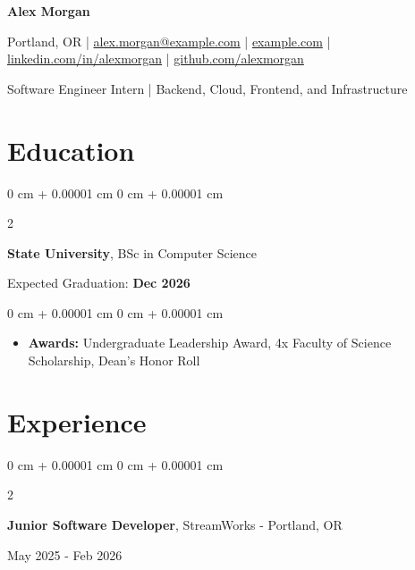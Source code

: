 \documentclass[10pt, letterpaper]{article}
\newenvironment{onecolentry}{
    \begin{adjustwidth}{
        0 cm + 0.00001 cm
    }{
        0 cm + 0.00001 cm
    }
}{
    \end{adjustwidth}
}
\newenvironment{twocolentry}[2][]{
    \onecolentry
    \def\secondColumn{#2}
    \setcolumnwidth{\fill, 6 cm}
    \begin{paracol}{2}
}{
    \switchcolumn \raggedleft \secondColumn
    \end{paracol}
    \endonecolentry
}
\begin{document}
    \begin{center}
        {\fontsize{24pt}{24pt}\selectfont\textbf{Alex Morgan}}
        
        \vspace{0.2cm}
        
        Portland, OR | \href{mailto:alex.morgan@example.com}{alex.morgan@example.com} | \href{https://example.com}{example.com} | \href{https://linkedin.com/in/alexmorgan}{linkedin.com/in/alexmorgan} | \href{https://github.com/alexmorgan}{github.com/alexmorgan}
        
        \vspace{0.1cm}
        Software Engineer Intern | Backend, Cloud, Frontend, and Infrastructure
    \end{center}
    
    \vspace{0.10 cm}
    \section{Education}

    \begin{twocolentry}{Expected Graduation: \textbf{Dec 2026}}
        \textbf{State University}, BSc in Computer Science
    \end{twocolentry}

    \vspace{0.10 cm}
    \begin{onecolentry}
        \begin{itemize}[leftmargin=2em, itemsep=1pt, parsep=0pt, topsep=0pt, partopsep=0pt]
            \item \textbf{Awards:} Undergraduate Leadership Award, 4x Faculty of Science Scholarship, Dean's Honor Roll
        \end{itemize}
    \end{onecolentry}
    
    \vspace{0.10 cm}
    \section{Experience}
    

    \begin{twocolentry}{May 2025 - Feb 2026}
        \textbf{Junior Software Developer}, StreamWorks - Portland, OR
    \end{twocolentry}
\end{document}
